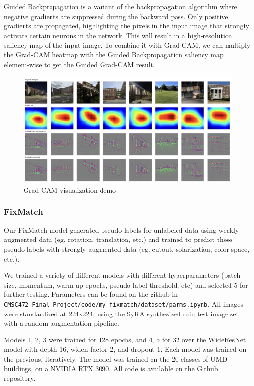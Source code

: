 \documentclass{article}
\begin{document}
Guided Backpropagation is a variant of the backpropagation algorithm where negative gradients are suppressed during the backward pass. Only positive gradients are propagated, highlighting the pixels in the input image that strongly activate certain neurons in the network. This will result in a high-resolution saliency map of the input image. To combine it with Grad-CAM, we can multiply the Grad-CAM heatmap with the Guided Backpropagation saliency map element-wise to get the Guided Grad-CAM result.  

\begin{figure}[H]
    \centering
    \includegraphics[width=0.8\linewidth]{gradcam_demo.png}
    \caption{Grad-CAM visualization demo}
    \label{fig:gradcam_demo}
\end{figure}

\subsubsection{FixMatch}

Our FixMatch model generated pseudo-labels for unlabeled data using weakly augmented data (eg. rotation, translation, etc.) and trained to predict these pseudo-labels with strongly augmented data (eg. cutout, solarization, color space, etc.).

We trained a variety of different models with different hyperparameters (batch size, momentum, warm up epochs, pseudo label threshold, etc) and selected 5 for further testing. Parameters can be found on the github in \verb*|CMSC472_Final_Project/code/my_fixmatch/dataset/parms.ipynb|. All images were standardized at 224x224, using the SyRA synthesized rain test image set with a random augmentation pipeline. 

Models 1, 2, 3 were trained for 128 epochs, and 4, 5 for 32 over the WideResNet model with depth 16, widen factor 2, and dropout 1. Each model was trained on the previous, iteratively. The model was trained on the 20 classes of UMD buildings, on a NVIDIA RTX 3090. All code is available on the Github repository.
\end{document}
